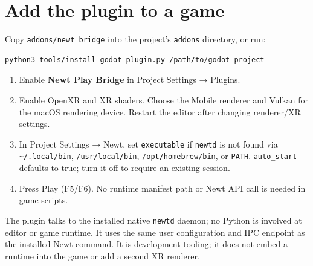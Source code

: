 \documentclass[11pt]{article}
\begin{document}
\section{Add the plugin to a game}
\label{sec:org2108953}
Copy \texttt{addons/newt\_bridge} into the project's \texttt{addons} directory, or run:
\begin{verbatim}
python3 tools/install-godot-plugin.py /path/to/godot-project
\end{verbatim}
\begin{enumerate}
\item Enable \textbf{Newt Play Bridge} in Project Settings → Plugins.
\item Enable OpenXR and XR shaders. Choose the Mobile renderer and Vulkan for the macOS rendering device. Restart the editor after changing renderer/XR settings.
\item In Project Settings → Newt, set \texttt{executable} if \texttt{newtd} is not found via \texttt{\textasciitilde{}/.local/bin}, \texttt{/usr/local/bin}, \texttt{/opt/homebrew/bin}, or \texttt{PATH}. \texttt{auto\_start} defaults to true; turn it off to require an existing session.
\item Press Play (F5/F6). No runtime manifest path or Newt API call is needed in game scripts.
\end{enumerate}

The plugin talks to the installed native \texttt{newtd} daemon; no Python is involved at editor or game runtime. It uses the same user configuration and IPC endpoint as the installed Newt command. It is development tooling; it does not embed a runtime into the game or add a second XR renderer.
\end{document}
